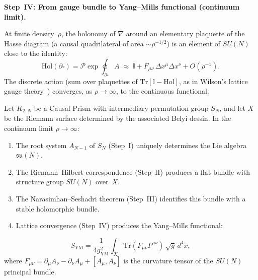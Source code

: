 \medskip\noindent
\textbf{Step~IV: From gauge bundle to Yang--Mills functional
(continuum limit).}

At finite density~$\rho$, the holonomy of $\nabla$ around an
elementary plaquette of the Hasse diagram (a causal quadrilateral of
area $\sim \rho^{-1/2}$) is an element of $SU(N)$ close to the
identity:
\[
  \mathrm{Hol}(\partial \square) = \mathcal{P}\exp\!\oint_{\partial \square}
  A \;\approx\; \mathbb{I} + F_{\mu\nu}\,\Delta x^\mu \Delta x^\nu
  + O(\rho^{-1}).
\]
The discrete action (sum over plaquettes of
$\mathrm{Tr}[\mathbb{I} - \mathrm{Hol}]$, as in Wilson's lattice
gauge theory~\cite{wilson1974}) converges, as
$\rho \to \infty$, to the continuous functional:

\begin{theorem}
\label{thm:yang-mills-continuum}
Let $K_{2,N}$ be a Causal Prism with intermediary permutation group
$S_N$, and let $X$ be the Riemann surface determined by the
associated Belyi dessin. In the continuum limit
$\rho \to \infty$:
\begin{enumerate}
  \item The root system $A_{N-1}$ of $S_N$ (Step~I) uniquely
    determines the Lie algebra $\mathfrak{su}(N)$.
  \item The Riemann--Hilbert correspondence (Step~II) produces a
    flat bundle with structure group $SU(N)$ over~$X$.
  \item The Narasimhan--Seshadri theorem (Step~III) identifies this
    bundle with a stable holomorphic bundle.
  \item Lattice convergence (Step~IV) produces the Yang--Mills
    functional:
\end{enumerate}
\begin{equation}
  S_{\mathrm{YM}} = \frac{1}{4g_{\mathrm{YM}}^2}
  \int_X \mathrm{Tr}(F_{\mu\nu} F^{\mu\nu})\,\sqrt{g}\,d^4x,
  \label{eq:yang-mills-action}
\end{equation}
where $F_{\mu\nu} = \partial_\mu A_\nu - \partial_\nu A_\mu
+ [A_\mu, A_\nu]$ is the curvature tensor of the $SU(N)$ principal
bundle.
\end{theorem}

